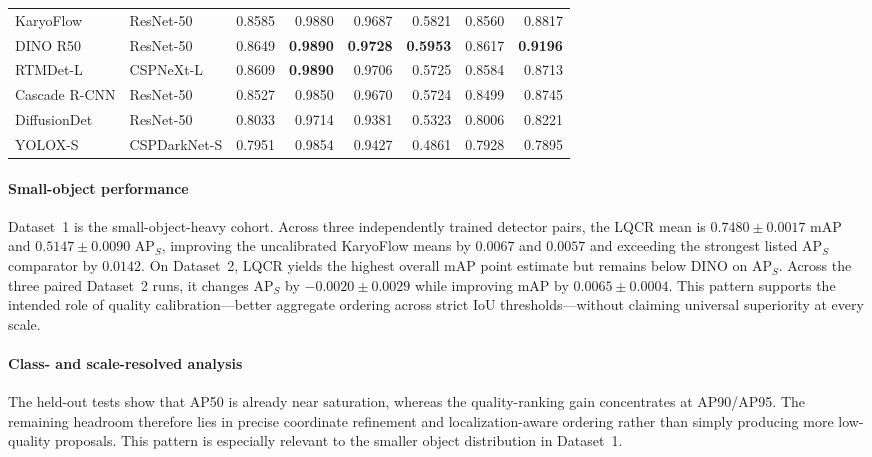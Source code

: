 \documentclass[journal,10pt]{IEEEtran}
\theoremstyle{definition}
\begin{document}
\begin{table}[t]
\begin{tabular}{@{}llrrrrrr@{}}
    KaryoFlow              & ResNet-50    & 0.8585 & 0.9880 & 0.9687 & 0.5821 & 0.8560 & 0.8817 \\
    DINO R50               & ResNet-50    & 0.8649 & \textbf{0.9890} & \textbf{0.9728} & \textbf{0.5953} & 0.8617 & \textbf{0.9196} \\
    RTMDet-L               & CSPNeXt-L    & 0.8609 & \textbf{0.9890} & 0.9706 & 0.5725 & 0.8584 & 0.8713 \\
    Cascade R-CNN          & ResNet-50    & 0.8527 & 0.9850 & 0.9670 & 0.5724 & 0.8499 & 0.8745 \\
    DiffusionDet           & ResNet-50    & 0.8033 & 0.9714 & 0.9381 & 0.5323 & 0.8006 & 0.8221 \\
    YOLOX-S                & CSPDarkNet-S & 0.7951 & 0.9854 & 0.9427 & 0.4861 & 0.7928 & 0.7895 \\
    \bottomrule
  \end{tabular}
\end{table}

\paragraph{Small-object performance}
Dataset~1 is the small-object-heavy cohort. Across three independently trained
detector pairs, the LQCR mean is
$0.7480\pm0.0017$ mAP and $0.5147\pm0.0090$ AP$_S$, improving
the uncalibrated KaryoFlow means by $0.0067$ and $0.0057$ and exceeding the
strongest listed AP$_S$ comparator by $0.0142$. On Dataset~2,
LQCR yields the highest overall mAP point estimate but remains below DINO on
AP$_S$. Across the three paired Dataset~2 runs, it changes AP$_S$ by
$-0.0020\pm0.0029$ while improving mAP by $0.0065\pm0.0004$. This pattern supports
the intended role of quality calibration---better aggregate ordering across
strict IoU thresholds---without claiming universal superiority at every scale.


\paragraph{Class- and scale-resolved analysis}
The held-out tests show that AP50 is already near saturation, whereas the
quality-ranking gain concentrates at AP90/AP95. The remaining headroom
therefore lies in precise coordinate refinement and localization-aware
ordering rather than simply producing more low-quality proposals. This pattern
is especially relevant to the smaller object distribution in Dataset~1.
\end{document}
